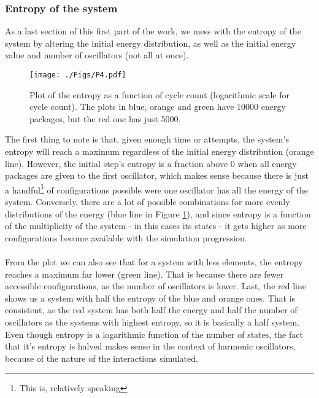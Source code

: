 \documentclass[a4paper, 12pt, notitlepage]{article}
\begin{document}
\subsubsection*{Entropy of the system}
As a last section of this first part of the work, we mess with the entropy of the system by altering the initial energy distribution, as well as the initial energy value and number of oscillators (not all at once).
\begin{figure}[h]
	\centering
	\texttt{[image: ./Figs/P4.pdf]}
	\caption{Plot of the entropy as a function of cycle count (logarithmic scale for cycle count). The plots in blue, orange and green have 10000 energy packages, but the red one has just 5000.}\label{fig:fig5}
\end{figure}
The first thing to note is that, given enough time or attempts, the system's entropy will reach a maximum regardless of the initial energy distribution (orange line). However, the initial step's entropy is a fraction above 0 when all energy packages are given to the first oscillator, which makes sense because there is just a handful\footnote{This is, relatively speaking} of configurations possible were one oscillator has all the energy of the system. Conversely, there are a lot of possible combinations for more evenly distributions of the energy (blue line in Figure \ref{fig:fig5}), and since entropy is a function of the multiplicity of the system - in this cases its states - it gets higher as more configurations become available with the simulation progression.\\\\
From the plot we can also see that for a system with less elements, the entropy reaches a maximum far lower (green line). That is because there are fewer accessible configurations, as the number of oscillators is lower. Last, the red line shows us a system with half the entropy of the blue and orange ones. That is consistent, as the red system has both half the energy and half the number of oscillators as the systems with highest entropy, so it is basically a half system. Even though entropy is a logarithmic function of the number of states, the fact that it's entropy is halved makes sense in the context of harmonic oscillators, because of the nature of the interactions simulated.
\end{document}
